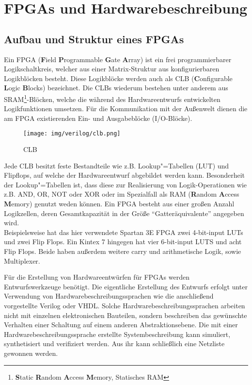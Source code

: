 \section{FPGAs und Hardwarebeschreibung}
\subsection{Aufbau und Struktur eines FPGAs}
Ein FPGA  (\textbf{F}ield \textbf{P}rogrammable \textbf{G}ate \textbf{A}rray) ist ein frei programmierbarer Logikschaltkreis, welcher aus einer Matrix-Struktur aus konfigurierbaren Logikblöcken besteht. Diese Logikblöcke werden auch als CLB (\textbf{C}onfigurable \textbf{L}ogic \textbf{B}locks) bezeichnet. Die CLBs wiederum bestehen unter anderem aus SRAM\footnote{\textbf{S}tatic \textbf{R}andom \textbf{A}ccess \textbf{M}emory, Statisches RAM}-Blöcken, welche die während des Hardwareentwurfs entwickelten Logikfunktionen umsetzen. Für die Kommunikation mit der Außenwelt dienen die am FPGA existierenden Ein- und Ausgabeblöcke (I/O-Blöcke).

\begin{figure}[H]
	\centering
	\texttt{[image: img/verilog/clb.png]}
	\caption{CLB \cite{clb_IMG}}
	\label{fig:clb}
\end{figure}

Jede CLB besitzt feste Bestandteile wie z.B. Lookup"=Tabellen (LUT) und Flipflops, auf welche der Hardwareentwurf abgebildet werden kann. Besonderheit der Lookup"=Tabellen ist, dass diese zur Realisierung von Logik-Operationen wie z.B. AND, OR, NOT oder XOR oder im Spezialfall als RAM (\textbf{R}andom \textbf{A}ccess \textbf{M}emory) genutzt weden können. Ein FPGA besteht aus einer großen Anzahl Logikzellen, deren Gesamtkapazität in der Größe "`Gatteräquivalente"' angegeben wird. \\
Beispielsweise hat das hier verwendete Spartan 3E FPGA zwei 4-bit-input LUTs und zwei Flip Flops. Ein Kintex 7 hingegen hat vier 6-bit-input LUTS und acht Flip Flops. Beide haben außerdem weitere carry und arithmetische Logik, sowie Multiplexer.


Für die Erstellung von Hardwareentwürfen für FPGAs werden Entwurfswerkzeuge benötigt. Die eigentliche Erstellung des Entwurfs erfolgt unter Verwendung von Hardwarebeschreibungssprachen wie die anschließend vorgestellte Verilog oder VHDL. Solche Hardwarebeschreibungssprachen arbeiten nicht mit einzelnen elektronischen Bauteilen, sondern beschreiben das gewünschte Verhalten einer Schaltung auf einem anderen Abstraktionsebene. Die mit einer Hardwarebeschreibungssprache erstellte Systembeschreibung kann simuliert, synthetisiert und verifiziert werden. Aus ihr kann schließlich eine Netzliste gewonnen werden. 


